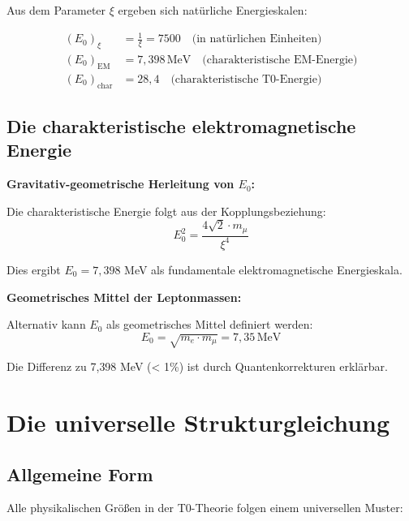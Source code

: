 	Aus dem Parameter $\xi$ ergeben sich natürliche Energieskalen:
	
	\begin{align}
		(E_0)_{\xi} &= \frac{1}{\xi} = 7500 \quad \text{(in natürlichen Einheiten)} \\
		(E_0)_{\text{EM}} &= 7{,}398\,\mathrm{MeV} \quad \text{(charakteristische EM-Energie)} \\
		(E_0)_{\text{char}} &= 28{,}4 \quad \text{(charakteristische T0-Energie)}
	\end{align}
	
	\subsection{Die charakteristische elektromagnetische Energie}
	
	\begin{keyresult}
		\textbf{Gravitativ-geometrische Herleitung von $E_0$:}
		
		Die charakteristische Energie folgt aus der Kopplungsbeziehung:
		\begin{equation}
			E_0^2 = \frac{4\sqrt{2} \cdot m_\mu}{\xi^4}
		\end{equation}
		
		Dies ergibt $E_0 = 7{,}398$ MeV als fundamentale elektromagnetische Energieskala.
	\end{keyresult}
	
	\begin{alternative}
		\textbf{Geometrisches Mittel der Leptonmassen:}
		
		Alternativ kann $E_0$ als geometrisches Mittel definiert werden:
		\begin{equation}
			E_0 = \sqrt{m_e \cdot m_\mu} = 7{,}35\,\mathrm{MeV}
		\end{equation}
		
		Die Differenz zu 7{,}398 MeV (< 1\%) ist durch Quantenkorrekturen erklärbar.
	\end{alternative}
	
	\section{Die universelle Strukturgleichung}
	
	\subsection{Allgemeine Form}
	
	Alle physikalischen Größen in der T0-Theorie folgen einem universellen Muster:
	
